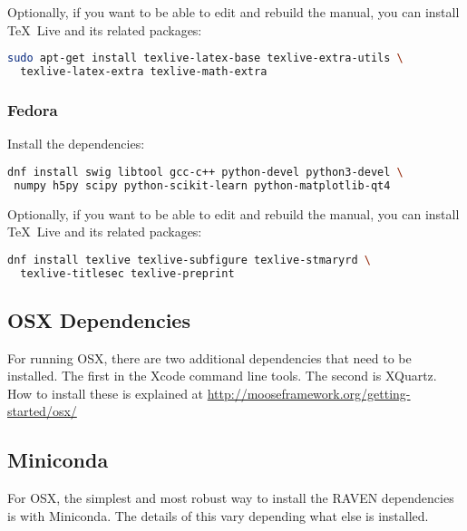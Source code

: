 
Optionally, if you want to be able to edit and rebuild the manual, you can
install \TeX~Live and its related packages:
\begin{lstlisting}[language=bash]
sudo apt-get install texlive-latex-base texlive-extra-utils \
  texlive-latex-extra texlive-math-extra
\end{lstlisting}


\subsubsection{Fedora}

Install the dependencies:

\begin{lstlisting}[language=bash]
dnf install swig libtool gcc-c++ python-devel python3-devel \
 numpy h5py scipy python-scikit-learn python-matplotlib-qt4
\end{lstlisting}

Optionally, if you want to be able to edit and rebuild the manual, you can
install \TeX~Live and its related packages:
\begin{lstlisting}[language=bash]
dnf install texlive texlive-subfigure texlive-stmaryrd \
  texlive-titlesec texlive-preprint
\end{lstlisting}

\subsection{OSX Dependencies}

For running OSX, there are two additional dependencies that need to be
installed.  The first in the Xcode command line tools.  The second is
XQuartz.  How to install these is explained at
\url{http://mooseframework.org/getting-started/osx/}


\subsection{Miniconda}

For OSX, the simplest and most robust way to install the RAVEN dependencies
is with Miniconda.  The details of this vary depending what else is
installed.


